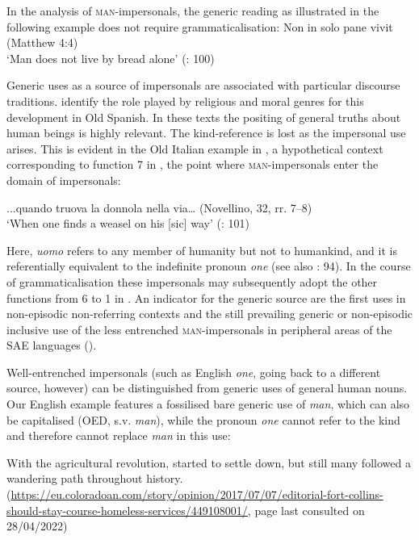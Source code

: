 \documentclass[output=paper]{langscibook}
\begin{document}
{In the analysis of} {\textsc{man}}{{}-impersonals, the generic reading as illustrated in the following example does not require grammaticalisation:}
\ea\label{ex:amaral:2}
 Non in solo pane vivit  {(Matthew 4:4)\\
 \glt‘Man does not live by bread alone’ (\citealt{GiacaloneRamatSansò2007}: 100)}\\
\z 


Generic uses as a source of impersonals are associated with particular discourse traditions. \citet[1171--1174]{CompanyPozas2009} identify the role played by religious and moral genres for this development in Old Spanish. In these texts the positing of general truths about human beings is highly relevant. The kind-reference is lost as the impersonal use arises. This is evident in the Old Italian example in , a hypothetical context corresponding to function 7 in , the point where \textsc{man}-impersonals enter the domain of impersonals:

\ea\label{ex:amaral:3}
 ...quando  truova la donnola nella via… (Novellino, 32, rr. 7--8)\\
 \glt ‘When one finds a weasel on his [sic] way’ (\citealt{GiacaloneRamatSansò2007}: 101)\\
\z 

Here, {\textit{uomo}} {refers to any member of humanity but not to humankind, and it is referentially equivalent to the indefinite pronoun} {\textit{one}} {(see also \citealt{GiacaloneRamatSansò2011}: 94). In the course of grammaticalisation these impersonals may subsequently adopt the other functions from 6 to 1 in . An indicator for the generic source are the first uses in non-episodic non-referring contexts and the still prevailing generic or non-episodic inclusive use of the less entrenched} {\textsc{man}}{{}-impersonals in peripheral areas of the SAE languages (\citealt{GiacaloneRamatSansò2007}).}



{Well-entrenched impersonals (such as English} {\textit{one}}{, going back to a different source, however) can be distinguished from generic uses of general human nouns. Our English example  features a fossilised bare generic use of} {\textit{man}}{, which can also be capitalised (OED, s.v.} {\textit{man}}{), while the pronoun} {\textit{one}} {cannot refer to the kind and therefore cannot replace} {\textit{man}} {in this use:}

\ea\label{ex:amaral:4}
With the agricultural revolution,  started to settle down, but still many followed a wandering path throughout history.\\ (\url{https://eu.coloradoan.com/story/opinion/2017/07/07/editorial-fort-collins-should-stay-course-homeless-services/449108001/}{, page last consulted on 28/04/2022)}
\z 
\end{document}
